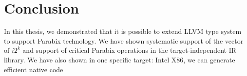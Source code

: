 %
%

\chapter{Conclusion}
\label{seven}

In this thesis, we demonstrated that it is possible to extend LLVM type system to support Parabix technology. We have shown systematic support of the vector of $i2^k$ and support of critical Parabix operations in the target-independent IR library. We have also shown in one specific target: Intel X86, we can generate efficient native code
